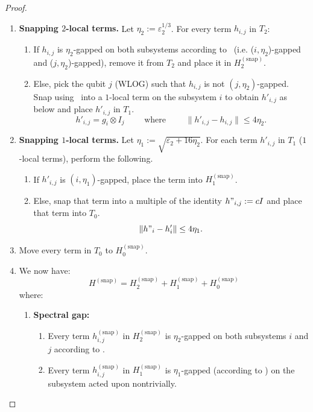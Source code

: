 \documentclass[11pt]{article}
\theoremstyle{plain}
\newcommand{\eps}{\varepsilon}
\newcommand{\snp}{{(\mathrm{snap})}}
\begin{document}
\begin{proof}
\begin{enumerate}
    Let $\eps_2 = \eps$.
    \item \textbf{Snapping $2$-local terms.} Let $\eta_2 := \eps_2^{1/3}$. For every term $h_{i, j}$ in $T_2$:
    \begin{enumerate}
        \item If $h_{i, j}$ is $\eta_2$-gapped on both subsystems according to~ (i.e. ($i, \eta_2$)-gapped and ($j, \eta_2$)-gapped), remove it from $T_2$ and place it in $H^\snp_2$.
        \item Else, pick the qubit $j$ (WLOG) such that $h_{i, j}$ is not $(j, \eta_2)$-gapped. Snap using~ into a $1$-local term on the subsystem $i$ to obtain $h'_{i,j}$ as below and place $h'_{i,j}$ in $T_1$.
        \begin{equation}
        h'_{i,j} = g_i \otimes I_j  \quad\quad \text{ where }\quad\quad     \| h'_{i,j} - h_{i,j} \| \leq 4\eta_2.
        \end{equation}
    \end{enumerate}
    \item \textbf{Snapping $1$-local terms.} Let $\eta_1 := \sqrt{\eps_2 + 16\eta_2}$. For each term $h'_{i,j}$ in $T_1$ ($1$-local terms), perform the following.
    \begin{enumerate}
        \item If $h'_{i,j}$ is $(i, \eta_1)$-gapped, place the term into $H^\snp_1$.
        \item Else, snap that term into a multiple of the identity $h"_{i,j} := c I$ and place that term into $T_0$.
        \begin{equation}
            \|h"_i - h'_i\| \leq 4 \eta_1.
        \end{equation}
    \end{enumerate}
    \item Move every term in $T_0$ to $H^\snp_0$.
    \item We now have:
    \begin{equation}
        H^\snp = H^\snp_2 + H^\snp_1 + H^\snp_0
    \end{equation}
    where:
    \begin{enumerate}
    \item \textbf{Spectral gap:}
    \begin{enumerate}
        \item Every term $h_{i,j}^\snp$ in $H^\snp_2$ is $\eta_2$-gapped on both subsystems $i$ and $j$ according to .
        \item Every term $h_{i,j}^\snp$ in $H^\snp_1$ is $\eta_1$-gapped (according to ) on the subsystem acted upon nontrivially.

\end{enumerate}
\end{enumerate}
\end{enumerate}
\end{proof}
\end{document}
